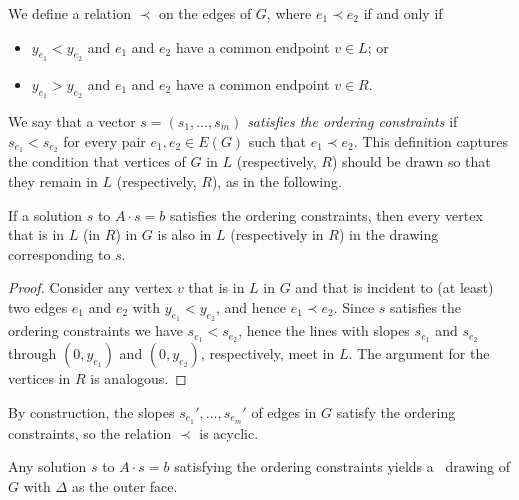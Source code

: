 We define a relation $\prec$ on the edges of $G$, where $e_1 \prec e_2$ if and only if
\begin{itemize}
	\item $y_{e_1} < y_{e_2}$ and $e_1$ and $e_2$ have a common endpoint $v\in L$; or
	\item $y_{e_1} > y_{e_2}$ and $e_1$ and $e_2$ have a common endpoint $v\in R$.
\end{itemize}
We say that a vector $s=(s_1,\ldots,s_m)$ \emph{satisfies the ordering
	constraints} if $s_{e_1} < s_{e_2}$ for every pair $e_1,e_2\in E(G)$
such that $e_1\prec e_2$. This definition captures the condition that vertices of $G$ in $L$ (respectively, $R$) should be drawn so that they remain in $L$ (respectively, $R$), as in the following. 

\begin{obs}
If a solution $s$ to $A\cdot s=b$ satisfies the ordering constraints, then every vertex that is in $L$ (in $R$) in $G$ is also in $L$ (respectively in $R$) in the drawing corresponding to $s$. 
\end{obs}

\begin{proof}	  
Consider any vertex $v$ that is in $L$ in $G$ and that is incident to
(at least) two edges $e_1$ and $e_2$ with $y_{e_1} < y_{e_2}$, and hence $e_1 \prec e_2$. Since $s$ satisfies the ordering constraints we have $s_{e_1} < s_{e_2}$, hence the lines with slopes $s_{e_1}$ and $s_{e_2}$ through $(0,y_{e_1})$ and $(0,y_{e_2})$, respectively, meet in $L$. The argument for the vertices in $R$ is analogous. 
\end{proof}	  

By construction, the slopes $s_{e_1}',\ldots,s_{e_m}'$ of edges
in $G$ satisfy the ordering constraints, so the relation $\prec$ is acyclic.

\begin{lem}
	Any solution $s$ to $A\cdot s=b$ satisfying
	the ordering constraints %
	yields a
	\Fary\ drawing of $G$ with $\Delta$ as the outer face.
\end{lem}

